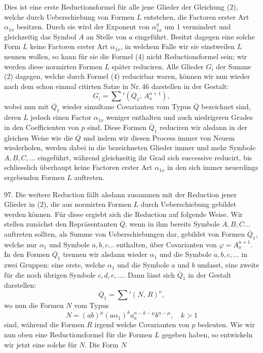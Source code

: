 Dies ist eine erste Reductionsformel für alle jene Glieder der Gleichung (2), welche durch Ueberschiebung von Formen $L$ entstehen, die Factoren erster Art $\alpha_{1x}$ besitzen. Durch sie wird der Exponent von $\alpha_{1x}^\varrho$ um 1 vermindert und gleichzeitig das Symbol $A$ an Stelle von $a$ eingeführt. Besitzt dagegen eine solche Form $L$ keine Factoren erster Art $\alpha_{1x}$, in welchem Falle wir sie einstweilen  $L$ nennen wollen, so kann für sie die Formel (4) nicht Reductionsformel sein; wir werden diese normirten Formen $L$ später reduciren. Alle Glieder $G_i$ der Summe (2) dagegen, welche durch Formel (4) reducirbar waren, können wir nun wieder nach dem schon einmal citirten Satze in Nr.\,46 darstellen in der Gestalt:
\[
G_i = \sum{}' (\overline{Q}_1,\, A_x^{n+1}),
\]
wobei nun mit $\overline{Q}_1$ wieder simultane Covarianten vom Typus $\overline{Q}$ bezeichnet sind, deren $L$ jedoch einen Factor $\alpha_{1x}$ weniger enthalten und auch niedrigeren Grades in den Coefficienten von $p$ sind. Diese Formen $\overline{Q}_1$ reduciren wir alsdann in der gleichen Weise wie die $\overline{Q}$ und indem wir diesen Process immer von Neuem wiederholen, werden dabei in die bezeichneten Glieder immer und mehr Symbole $A, B, C,\ldots$ eingeführt, während gleichzeitig ihr Grad sich successive reducirt, bis schliesslich überhaupt keine Factoren erster Art $\alpha_{1x}$ in den sich immer neuerdings ergebenden Formen $L$ auftreten.

97. Die weitere Reduction fällt alsdann zusammen mit der Reduction jener Glieder in (2), die aus normirten Formen $L$ durch Ueberschiebung gebildet werden können. Für diese ergiebt sich die Reduction auf folgende Weise. Wir stellen zunächst den Repräsentanten $\overline{Q}$, wenn in ihm bereits Symbole $A, B, C\ldots$ auftreten sollten, als Summe von Ueberschiebungen dar, gebildet von Formen $\overline{Q}_1$, welche nur $\alpha_1$ und Symbole $a, b, c\ldots$ enthalten, über Covarianten von $\varphi = A_x^{n+1}$. In den Formen $\overline{Q}_1$ trennen wir alsdann wieder $\alpha_1$ und die Symbole $a, b, c, \ldots$ in zwei Gruppen: eine erste, welche $\alpha_1$ und die Symbole $a$ und $b$ umfasst, eine zweite für die noch übrigen Symbole $c, d, e,\ldots$. Dann lässt sich $\overline{Q}_1$ in der Gestalt darstellen:
\[
\overline{Q}_1 = \sum{}' (N,\, R)^\nu,
\]
wo nun die Formen $N$ vom Typus
\[
N = (ab)^\mu (a\alpha_1)^k a_x^{n-k-\mu} b^{n-\mu}, \quad k > 1
\]
sind, während die Formen $R$ irgend welche Covarianten von $p$ bedeuten. Wie wir nun oben eine Reductionsformel für die Formen $L$ gegeben haben, so entwickeln wir jetzt eine solche für $N$. Die Form $N$


